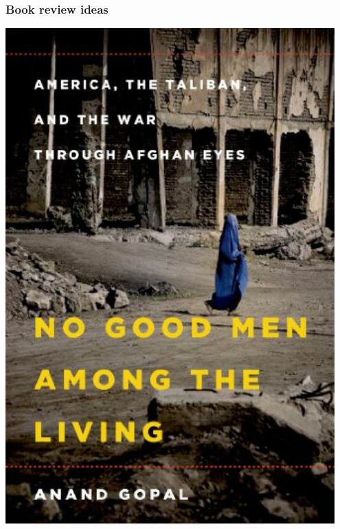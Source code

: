 \documentclass[aspectratio=43]{beamer}
\begin{document}
\begin{frame}
\frametitle{Book review ideas}
\centering

\begin{minipage}{0.45\textwidth}\centering
\includegraphics[width = 0.95\textwidth]{img/no_good_men}
\end{minipage}\hfill
\begin{minipage}{0.45\textwidth}\centering

\end{minipage}
\end{frame}
\end{document}
